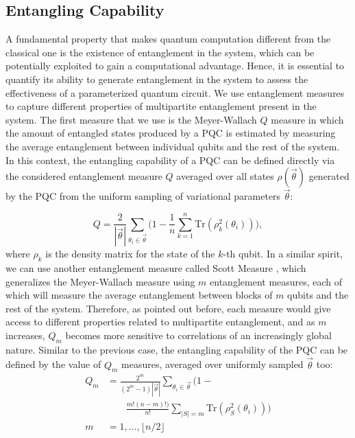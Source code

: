\subsection{Entangling Capability}

A fundamental property that makes quantum computation different from the classical one is the existence of entanglement in the system, which can be potentially exploited to gain a computational advantage. Hence, it is essential to quantify its ability to generate entanglement in the system to assess the effectiveness of a parameterized quantum circuit. We use entanglement measures to capture different properties of multipartite entanglement present in the system. The first measure that we use is the Meyer-Wallach $Q$ measure \cite{10.1002/qute.201900070, doi:10.1063/1.1497700} in which the amount of entangled states produced by a PQC is estimated by measuring the average entanglement between individual qubits and the rest of the system. In this context, the entangling capability of a PQC can be defined directly via the considered entanglement measure $Q$ averaged over all states $\rho(
\vec{\theta})$ generated by the PQC from the uniform sampling of variational parameters $\vec{\theta}$:

\begin{equation}
	Q = \frac{2}{|\vec{\theta}|}\sum_{\theta_{i}\in \vec{\theta}}\Bigg(1-\frac{1}{n}\sum_{k=1}^{n}\text{Tr}(\rho_{k}^{2}(\theta_{i}))\Bigg),
\end{equation}
where $\rho_k$ is the density matrix for the state of the $k$-th qubit. In a similar spirit, we can use another entanglement measure called Scott Measure \cite{10.1007/s11128-007-0052-7}, which generalizes the Meyer-Wallach measure using $m$ entanglement measures, each of which will measure the average entanglement between blocks of $m$ qubits and the rest of the system. Therefore, as pointed out before, each measure would give access to different properties related to multipartite entanglement, and as $m$ increases, $Q_m$ becomes more sensitive to correlations of an increasingly global nature. Similar to the previous case, the entangling capability of the PQC can be defined by the value of $Q_m$ measures, averaged over uniformly sampled $\vec{\theta}$ too:
\begin{equation}
    \begin{split}
        Q_{m} &= \frac{2^{m}}{(2^{m}-1) |\vec{\theta}|}\sum_{\theta_i \in \vec{\theta}} \bigg(1 - \\ 
        & \quad \quad \frac{m! (n-m)!)}{n!}\sum_{|S|=m} \text{Tr} (\rho_{S}^2 (\theta_i)) \bigg) \\
        m &= 1, \ldots, \lfloor n/2 \rfloor
    \end{split}
\end{equation}

